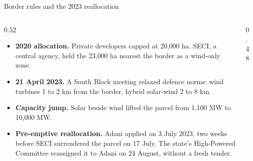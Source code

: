 \documentclass[aspectratio=169,10pt,t]{beamer}
\newcommand{\dia}[2]{\resizebox{!}{#2}{}}      %
\newcommand{\diaw}[2]{\resizebox{#2}{!}{}}     %
\newenvironment{pts}{\begin{itemize}\footnotesize\setlength{\itemsep}{3pt}}{\end{itemize}}
\begin{document}
\begin{frame}{Border rules and the 2023 reallocation}
  \begin{columns}[T]
    \begin{column}{0.52\textwidth}
      \begin{pts}
        \item \textbf{2020 allocation.} Private developers capped at 20,000 ha. SECI, a central agency, held the 23,000 ha nearest the border as a wind-only zone.
        \item \textbf{21 April 2023.} A South Block meeting relaxed defence norms: wind turbines 1 to 2 km from the border, hybrid solar-wind 2 to 8 km.
        \item \textbf{Capacity jump.} Solar beside wind lifted the parcel from 1,100 MW to 10,000 MW.
        \item \textbf{Pre-emptive reallocation.} Adani applied on 3 July 2023, two weeks before SECI surrendered the parcel on 17 July. The state's High-Powered Committee reassigned it to Adani on 24 August, without a fresh tender.
      \end{pts}
    \end{column}
    \begin{column}{0.48\textwidth}
      \centering\dia{d05_border_zones}{3.9cm}
    \end{column}
  \end{columns}
  \vspace{1mm}
  \centering\diaw{d05_timeline}{\textwidth}
\end{frame}
\end{document}
